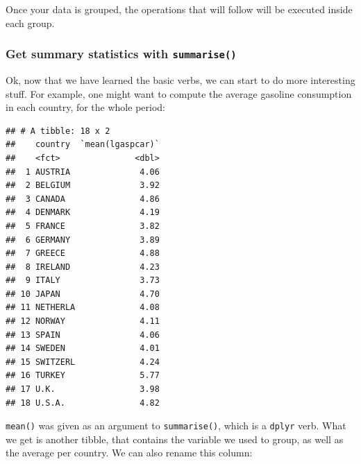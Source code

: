 \documentclass[]{gitbook}
\newenvironment{Shaded}{\begin{snugshade}}{\end{snugshade}}
\newcommand{\DataTypeTok}[1]{\textcolor[rgb]{0.13,0.29,0.53}{#1}}
\newcommand{\KeywordTok}[1]{\textcolor[rgb]{0.13,0.29,0.53}{\textbf{#1}}}
\newcommand{\NormalTok}[1]{#1}
\newcommand{\OperatorTok}[1]{\textcolor[rgb]{0.81,0.36,0.00}{\textbf{#1}}}
\newcommand{\StringTok}[1]{\textcolor[rgb]{0.31,0.60,0.02}{#1}}
\theoremstyle{definition}
\theoremstyle{definition}
\theoremstyle{definition}
\theoremstyle{remark}
\begin{document}
Once your data is grouped, the operations that will follow will be
executed inside each group.

\hypertarget{get-summary-statistics-with-summarise}{%
\subsubsection{\texorpdfstring{Get summary statistics with
\texttt{summarise()}}{Get summary statistics with summarise()}}\label{get-summary-statistics-with-summarise}}

Ok, now that we have learned the basic verbs, we can start to do more
interesting stuff. For example, one might want to compute the average
gasoline consumption in each country, for the whole period:

\begin{Shaded}
\end{Shaded}

\begin{verbatim}
## # A tibble: 18 x 2
##    country  `mean(lgaspcar)`
##    <fct>               <dbl>
##  1 AUSTRIA              4.06
##  2 BELGIUM              3.92
##  3 CANADA               4.86
##  4 DENMARK              4.19
##  5 FRANCE               3.82
##  6 GERMANY              3.89
##  7 GREECE               4.88
##  8 IRELAND              4.23
##  9 ITALY                3.73
## 10 JAPAN                4.70
## 11 NETHERLA             4.08
## 12 NORWAY               4.11
## 13 SPAIN                4.06
## 14 SWEDEN               4.01
## 15 SWITZERL             4.24
## 16 TURKEY               5.77
## 17 U.K.                 3.98
## 18 U.S.A.               4.82
\end{verbatim}

\texttt{mean()} was given as an argument to \texttt{summarise()}, which
is a \texttt{dplyr} verb. What we get is another tibble, that contains
the variable we used to group, as well as the average per country. We
can also rename this column:

\begin{Shaded}
\end{Shaded}
\end{document}
